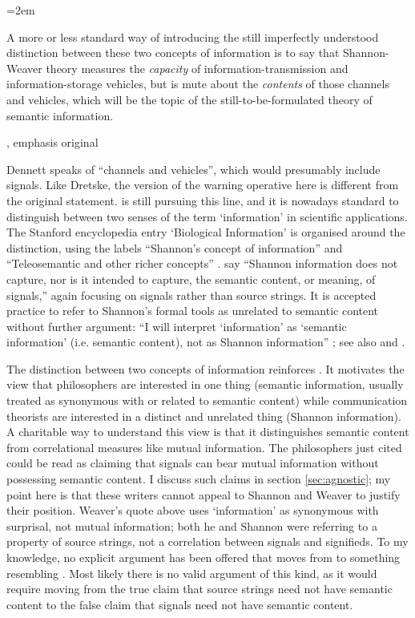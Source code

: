 \documentclass[12pt]{article}
\begin{document}
{ \emergencystretch=2em

\begin{myquote}
A more or less standard way of introducing the still imperfectly understood distinction between these two concepts of information is to say that Shannon-Weaver theory measures the \emph{capacity} of information-transmission and information-storage vehicles, but is mute about the \emph{contents} of those channels and vehicles, which will be the topic of the still-to-be-formulated theory of semantic information.
\par\hspace*{\fill}\citet[344]{dennett1983intentional}, emphasis original
\end{myquote}

}

\noindent Dennett speaks of ``channels and vehicles'', which would presumably include signals.
Like Dretske, the version of the warning operative here is different from the original statement.
\citet[$\S$6]{dennett2017bacteria} is still pursuing this line, and it is nowadays standard to distinguish between two senses of the term `information' in scientific applications.
The Stanford encyclopedia entry `Biological Information' is organised around the distinction, using the labels ``Shannon's concept of information'' and ``Teleosemantic and other richer concepts'' \citep{godfrey-smith2016biological}.
\citet[21]{piccinini2011information} say ``Shannon information does not capture, nor is it intended to capture, the semantic content, or meaning, of signals,'' again focusing on signals rather than source strings.
It is accepted practice to refer to Shannon's formal tools as unrelated to semantic content without further argument: ``I will interpret ‘information’ as ‘semantic information’ (i.e. semantic content), not as Shannon information'' \citep[p. 12 n. 14]{artiga2021signals}; see also \citet[6]{cao2020new} and \citet[1]{kolchinsky2018semantic}.

The distinction between two concepts of information reinforces \tic{}.
It motivates the view that philosophers are interested in one thing (semantic information, usually treated as synonymous with or related to semantic content) while communication theorists are interested in a distinct and unrelated thing (Shannon information).
A charitable way to understand this view is that it distinguishes semantic content from correlational measures like mutual information.
The philosophers just cited could be read as claiming that signals can bear mutual information without possessing semantic content.
I discuss such claims in section \ref{sec:agnostic}; my point here is that these writers cannot appeal to Shannon and Weaver to justify their position.
Weaver's quote above uses `information' as synonymous with surprisal, not mutual information; both he and Shannon were referring to a property of source strings, not a correlation between signals and signifieds.
To my knowledge, no explicit argument has been offered that moves from \sw{} to something resembling \tic{}.
Most likely there is no valid argument of this kind, as it would require moving from the true claim that source strings need not have semantic content to the false claim that signals need not have semantic content.
\end{document}
